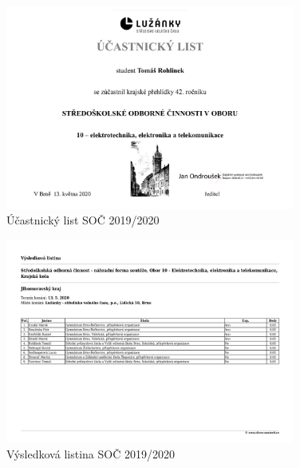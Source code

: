 \begin{figure}[htbp]
    \centering
    \includegraphics[width=0.85\textwidth]{img/participation.jpg}
    \caption{Účastnický list SOČ 2019/2020}
    \label{fig:particip}
\end{figure}

\newpage

\begin{figure}[htbp]
    \centering
    \includegraphics[angle=90,width=0.85\textwidth]{img/results.jpg}
    \caption{Výsledková listina SOČ 2019/2020}
    \label{fig:results}
\end{figure}
